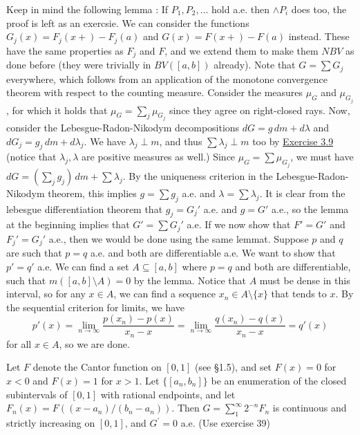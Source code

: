 \documentclass[12pt,a4paper]{article}
\begin{document}
\begin{solution}
    Keep in mind the following lemma : If $P_1,P_2,\ldots$ hold a.e. then $\land P_i$ does too, the proof is left as an exercsie.
    We can consider the functions $G_j(x)=F_j(x+)-F_j(a)$ and $G(x)=F(x+)-F(a)$ instead. These have the same properties as $F_j$ and $F$, and we extend them to make them $NBV$ as done before (they were trivially in $BV([a,b])$ already). Note that $G=\sum G_j$ everywhere, which follows from an application of the monotone convergence theorem with respect to the counting measure. 
    Consider the measures $\mu_G$ and $\mu_{G_j}$, for which it holds that $\mu_G=\sum_j\mu_{G_j}$ since they agree on right-closed rays. Now, consider the Lebesgue-Radon-Nikodym decompositions $dG = g \, dm + d\lambda$ and $dG_j = g_j \, dm + d\lambda_j$. 
    We have $\lambda_j \perp m$, and thus $\sum \lambda_j \perp m$ too by \hyperref[prob:3-9]{Exercise 3.9} (notice that $\lambda_j,\lambda$ are positive measures as well.)
    Since $\mu_G = \sum \mu_{G_j}$, we must have $dG = (\sum_j g_j) \, dm + \sum \lambda_j$. By the uniqueness criterion in the Lebesgue-Radon-Nikodym theorem, this implies $g = \sum g_j$ a.e. and $\lambda = \sum \lambda_j$. 
    It is clear from the lebesgue differentiation theorem that $g_j = G_j'$ a.e. and $g = G'$ a.e., so the lemma at the beginning implies that $G' = \sum G_j'$ a.e.  
    If we now show that $F' = G'$ and $F_j' = G_j'$ a.e., then we would be done using the same lemmat. Suppose $p$ and $q$ are such that $p = q$ a.e. and both are differentiable a.e. We want to show that $p' = q'$ a.e. We can find a set $A \subseteq [a,b]$ where $p = q$ and both are differentiable, such that $m([a,b] \setminus A) = 0$ by the lemma. 
    Notice that $A$ must be dense in this interval, so for any $x \in A$, we can find a sequence $x_n \in A \setminus \{x\}$ that tends to $x$. By the sequential criterion for limits, we have
    \[
        p'(x) = \lim_{n \to \infty} \frac{p(x_n) - p(x)}{x_n - x} = \lim_{n \to \infty} \frac{q(x_n) - q(x)}{x_n - x} = q'(x)
    \]
    for all $x \in A$, so we are done.
\end{solution}
\begin{problem}\label{prob:3-40}
Let $F$ denote the Cantor function on $[0, 1]$ (see §1.5), and set $F(x)=0$ for $x<0$ and $F(x)=1$ for $x>1$. Let $\{[a_{n},b_{n}]\}$ be an enumeration of the closed subintervals of $[0, 1]$ with rational endpoints, and let $F_{n}(x)=F((x-a_{n})/(b_{n}-a_{n}))$. Then $G=\sum_{1}^{\infty}2^{-n}F_{n}$ is continuous and strictly increasing on $[0, 1]$, and $G^{\prime}=0$ a.e. (Use exercise 39)
\end{problem}
\end{document}
